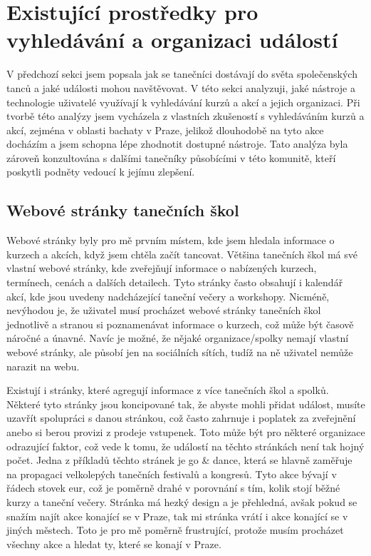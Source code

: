 \section{Existující prostředky pro vyhledávání a organizaci událostí}
V předchozí sekci jsem popsala jak se tanečníci dostávají do světa společenských tanců a jaké události mohou navštěvovat. V této sekci analyzuji, jaké nástroje a technologie uživatelé využívají k vyhledávání kurzů a akcí a jejich organizaci. Při tvorbě této analýzy jsem vycházela z vlastních zkušeností s vyhledáváním kurzů a akcí, zejména v oblasti bachaty v Praze, jelikož dlouhodobě na tyto akce docházím a jsem schopna lépe zhodnotit dostupné nástroje. Tato analýza byla zároveň konzultována s dalšími tanečníky působícími v této komunitě, kteří poskytli podněty vedoucí k jejímu zlepšení.

\subsection{Webové stránky tanečních škol}
Webové stránky byly pro mě prvním místem, kde jsem hledala informace o kurzech a akcích, když jsem chtěla začít tancovat. Většina tanečních škol má své vlastní webové stránky, kde zveřejňují informace o nabízených kurzech, termínech, cenách a dalších detailech. Tyto stránky často obsahují i kalendář akcí, kde jsou uvedeny nadcházející taneční večery a workshopy. Nicméně, nevýhodou je, že uživatel
musí procházet webové stránky tanečních škol jednotlivě a stranou si poznamenávat informace o kurzech, což může být časově náročné a únavné. Navíc je možné, že nějaké organizace/spolky nemají vlastní webové stránky, ale působí jen na sociálních sítích, tudíž na ně uživatel nemůže narazit na webu.

Existují i stránky, které agregují informace z více tanečních škol a spolků. Některé tyto stránky jsou koncipované tak, že abyste mohli přidat událost, musíte uzavřít spolupráci s danou stránkou, což často zahrnuje i poplatek za zveřejnění anebo si berou provizi z prodeje vstupenek. Toto může být pro některé organizace odrazující faktor, což vede k tomu, že událostí na těchto stránkách není tak hojný počet. Jedna z příkladů těchto stránek je go \& dance, která se hlavně zaměřuje na propagaci velkolepých tanečních festivalů a kongresů. Tyto akce bývají v řádech stovek eur, což je poměrně drahé v porovnání s tím, kolik stojí běžné kurzy a taneční večery. Stránka má hezký design a je přehledná, avšak pokud se snažím najít akce konající se v Praze, tak mi stránka vrátí i akce konající se v jiných městech. Toto je pro mě poměrně frustrující, protože musím procházet všechny akce a hledat ty, které se konají v Praze.


